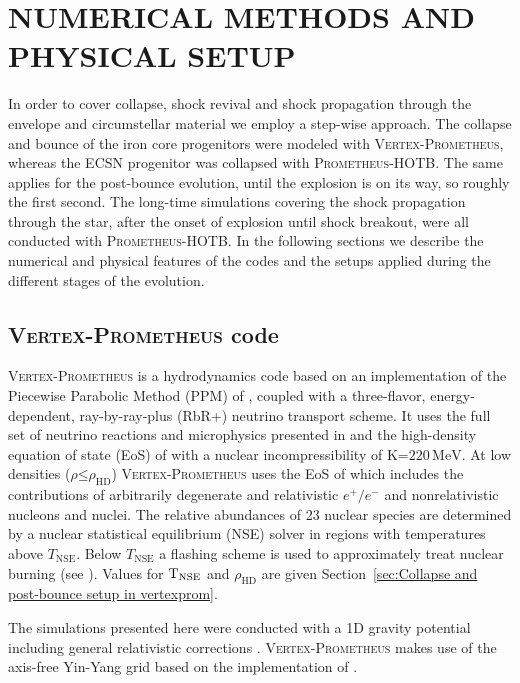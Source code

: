 \documentclass[fleqn,usenatbib]{mnras}
\newcommand{\prom}{\textsc{Prometheus-HOTB}\xspace}
\newcommand{\vertexprom}{\textsc{Vertex-Prometheus}\xspace}
\begin{document}
\section{NUMERICAL METHODS AND PHYSICAL SETUP}
\label{sec:Numerical and physical Setup}
In order to cover collapse, shock revival 
and shock propagation through the envelope and 
circumstellar material we employ a step-wise approach.
The collapse and bounce of the iron core progenitors 
were modeled with \vertexprom, whereas the ECSN progenitor 
was collapsed with \prom.
The same applies for the post-bounce evolution, until the 
explosion is on its way, so roughly the first second. 
The long-time simulations covering the shock propagation 
through the star, after the onset of explosion until shock 
breakout, were all conducted with \prom.
In the following sections we describe the numerical and physical 
features of the codes and the setups applied during the different 
stages of the evolution.

\subsection{\vertexprom code}
\vertexprom is a hydrodynamics code based on an implementation of the 
Piecewise Parabolic Method (PPM) \newline of \cite{Colella1984}, coupled 
with a three-flavor, energy-dependent, ray-by-ray-plus (RbR+) 
neutrino transport scheme. It uses the full set of neutrino reactions and 
microphysics presented in \cite{Buras2006} and the high-density equation 
of state (EoS) of \cite{Lattimer1991} with a nuclear incompressibility of 
$\mathrm{K}\mathord{=} 220\,\mathrm{MeV}$.
At low densities ($\rho\mathord{\leq}\rho_{\mathrm{HD}}$) 
\vertexprom uses the EoS of \cite{Janka1999} which 
includes the contributions of arbitrarily degenerate and relativistic $e^+/e^-$ 
and nonrelativistic nucleons and nuclei. The relative abundances of 23 nuclear
species are determined by a nuclear statistical equilibrium (NSE) solver in 
regions with temperatures above $T_{\mathrm{NSE}}$. Below $T_{\mathrm{NSE}}$ a 
flashing scheme is used to approximately treat nuclear burning 
(see \citealt{Rampp2002}). Values for $\rm T_{NSE}$ and 
$\rho_{\mathrm{HD}}$ are given Section~\ref{sec:Collapse and post-bounce setup in vertexprom}.

The simulations presented here were conducted with a 1D gravity potential 
including general relativistic corrections \citep{Marek2006}. \vertexprom
makes use of the axis-free Yin-Yang grid \citep{Kageyama2004} based on 
the implementation of \cite{Melson2016}.
\end{document}
